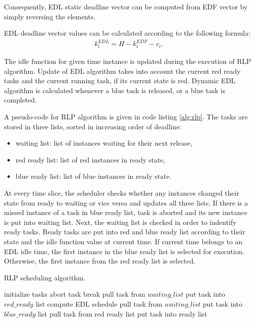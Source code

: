 Consequently, EDL static deadline vector can be computed from EDF vector by simply reversing the elements.

EDL deadline vector values can be calculated according to the following formula:
\begin{align}
k_i^{EDL} = H - k_i^{EDF} - c_i.
\end{align} 

The idle function for given time instance is updated during the execution of RLP algorithm. 
Update of EDL algorithm takes into account the current red ready tasks and the current running task, if its current state is red. 
Dynamic EDL algorithm is calculated whenever a blue task is released, or a blue task is completed. 

A pseudo-code for RLP algorithm is given in code listing \ref{alg:rlp}.
The tasks are stored in three lists, sorted in increasing order of deadline: 
\begin{itemize}
	\item{waiting list: list of instances waiting for their next release,}
	\item{red ready list: list of red instances in ready state,}
	\item{blue ready list: list of blue instances in ready state.}
\end{itemize}
At every time slice, the scheduler checks whether any instances changed their state from ready to waiting or vice versa and updates all three lists. 
If there is a missed instance of a task in blue ready list, task is aborted and its new instance is put into waiting list. 
Next, the waiting list is checked in order to indentify ready tasks. 
Ready tasks are put into red and blue ready list according to their state and the idle function value at current time. 
If current time belongs to an EDL idle time, the first instance in the blue ready list is selected for execution. Otherwise, the first instance from the red ready list is selected.

\begin{algorithm} %
\caption{RLP scheduling algorithm.\label{alg:rlp}}
\begin{algorithmic}
\STATE initialize tasks
\STATE abort task
\ENDIF
\ENDFOR
{}
\STATE break
\ENDIF
{}
\STATE pull task from $waiting\_list$
\STATE put task into $red\_ready$ list
\ELSE
{}
\STATE compute EDL schedule
\ENDIF
{}
\STATE pull task from $waiting\_list$
\STATE put task into $blue\_ready$ list
\ENDIF
\ENDIF
\ENDFOR
{}
\STATE pull task from red ready list
\STATE put task into ready list
\ENDFOR
\ENDIF
\end{algorithmic}
\end{algorithm}

